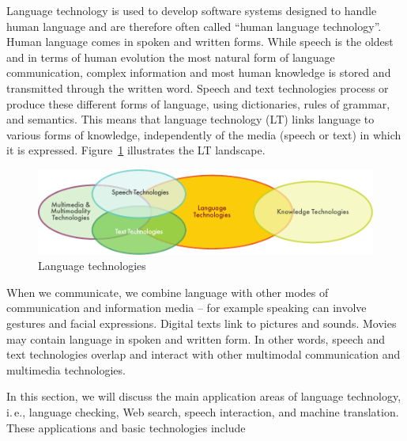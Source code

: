 \clearpage



\begin{multicols}{2}  

Language technology is used to develop software systems designed to handle human language and are therefore often called “human language technology”. Human language comes in spoken and written forms. While speech is the oldest and in terms of human evolution the most natural form of language communication, complex information and most human knowledge is stored and transmitted through the written word. Speech and text technologies process or produce these different forms of language, using dictionaries, rules of grammar, and semantics. This means that language technology (LT) links language to various forms of knowledge, independently of the media (speech or text) in which it is expressed. Figure~\ref{fig:ltincontext_en} illustrates the LT landscape.

\begin{figure}[htb]
  \center
  \includegraphics[width=\textwidth]{../_media/english/language_technologies}
  \caption{Language technologies}
  \label{fig:ltincontext_en}
\end{figure}

When we communicate, we combine language with other modes of communication and information media – for example speaking can involve gestures and facial expressions. Digital texts link to pictures and sounds. Movies may contain language in spoken and written form. In other words, speech and text technologies overlap and interact with other multimodal communication and multimedia technologies.

In this section, we will discuss the main application areas of language technology, i.\,e., language checking, Web search, speech interaction, and machine translation. These applications and basic technologies include 


\end{multicols}
